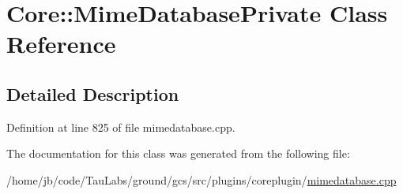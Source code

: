 \hypertarget{class_core_1_1_mime_database_private}{\section{\-Core\-:\-:\-Mime\-Database\-Private \-Class \-Reference}
\label{class_core_1_1_mime_database_private}
}


\subsection{\-Detailed \-Description}


\-Definition at line 825 of file mimedatabase.\-cpp.



\-The documentation for this class was generated from the following file\-:\begin{DoxyCompactItemize}
\item 
/home/jb/code/\-Tau\-Labs/ground/gcs/src/plugins/coreplugin/\hyperlink{mimedatabase_8cpp}{mimedatabase.\-cpp}\end{DoxyCompactItemize}
